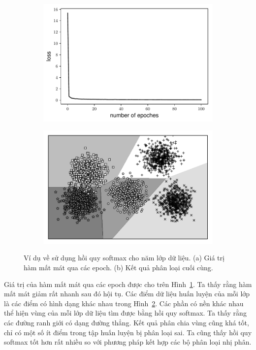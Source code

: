 \begin{figure}[t]
    \begin{subfigure}{0.49\textwidth}
    \includegraphics[width=0.99\linewidth]{ebookML_src/src/softmax_regression/softmax_loss.pdf}
    \caption{}
    \label{fig:13_exa}
    \end{subfigure}
    \begin{subfigure}{0.49\textwidth}
    \includegraphics[width=0.99\linewidth]{ebookML_src/src/softmax_regression/softmax_5class.pdf}
    \caption{}
    \label{fig:13_exb}
    \end{subfigure}
    \caption{
    Ví dụ về sử dụng hồi quy softmax cho năm lớp dữ liệu. (a) Giá trị hàm mất mát qua các
    epoch. (b) Kết quả phân loại cuối cùng. 
    }
    \label{fig:13_ex}
\end{figure}
Giá trị của hàm mất mát qua các epoch được cho trên Hình~\ref{fig:13_exa}. Ta
thấy rằng hàm mất mát giảm rất nhanh sau đó hội tụ. Các điểm dữ liệu huấn luyện
của mỗi lớp là các điểm có hình dạng khác nhau trong Hình~\ref{fig:13_exb}. Các
phần có nền khác nhau thể hiện vùng của mỗi lớp dữ liệu tìm được bằng hồi quy
softmax. Ta thấy rằng các đường ranh giới có dạng đường thẳng. Kết quả phân chia
vùng cũng khá tốt, chỉ có một số ít điểm trong tập huấn luyện bị phân loại sai.
Ta cũng thấy hồi quy softmax tốt hơn rất nhiều so với phương pháp kết hợp các bộ
phân loại nhị phân.

